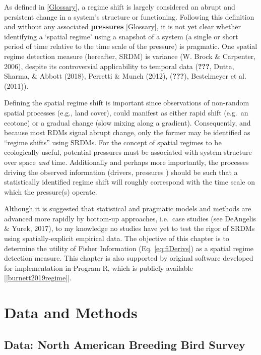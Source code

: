 \documentclass[12pt,twoside,openany]{reedthesis}
\begin{document}
As defined in \ref{Glossary}, a regime shift is largely considered an
abrupt and persistent change in a system's structure or functioning.
Following this definition and without any associated \textbf{pressures}
\ref{Glossary}, it is not yet clear whether identifying a `spatial
regime' using a snapshot of a system (a single or short period of time
relative to the time scale of the pressure) is pragmatic. One spatial
regime detection measure (hereafter, SRDM) is variance (W. Brock \&
Carpenter, 2006), despite its controversial applicability to temporal
data ({\textbf{???}}, Dutta, Sharma, \& Abbott (2018), Perretti \& Munch
(2012), ({\textbf{???}}), Bestelmeyer et al. (2011)).

Defining the spatial regime shift is important since observations of
non-random spatial processes (e.g., land cover), could manifest as
either rapid shift (e.g.~an ecotone) or a gradual change (slow mixing
along a gradient). Consequently, and because most RDMs signal abrupt
change, only the former may be identified as ``regime shifts'' using
SRDMs. For the concept of spatial regimes to be ecologically useful,
potential pressures must be associated with system structure over space
\emph{and} time. Additionally and perhaps more importantly, the
processes driving the observed information (drivers, pressures ) should
be such that a statistically identified regime shift will roughly
correspond with the time scale on which the pressure(s) operate.

Although it is suggested that statistical and pragmatic models and
methods are advanced more rapidly by bottom-up approaches, i.e.~case
studies (see DeAngelis \& Yurek, 2017), to my knowledge no studies have
yet to test the rigor of SRDMs using spatially-explicit empirical data.
The objective of this chapter is to determine the utility of Fisher
Information (Eq. \eqref{eq:fiDerivs}) as a spatial regime detection
measure. This chapter is also supported by original software developed
for implementation in Program R, which is publicly available
{[}\ref{burnett2019regime}{]}.

\section{Data and Methods}\label{data-and-methods}

\subsection{Data: North American Breeding Bird
Survey}\label{data-north-american-breeding-bird-survey}
\end{document}
